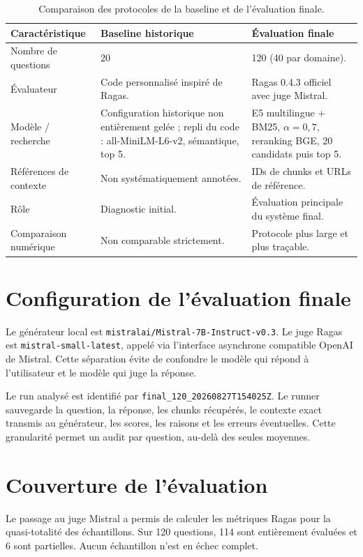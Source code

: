 \documentclass[12pt,a4paper,oneside]{report}
\begin{document}
\begin{table}[H]
\centering
\caption{Comparaison des protocoles de la baseline et de l'évaluation finale.}
\label{tab:protocoles}
\begin{tabularx}{\textwidth}{p{3.5cm}Y Y}
\toprule
\textbf{Caractéristique} & \textbf{Baseline historique} & \textbf{Évaluation finale}\\
\midrule
Nombre de questions & 20 & 120 (40 par domaine).\\
Évaluateur & Code personnalisé inspiré de Ragas. & Ragas 0.4.3 officiel avec juge Mistral.\\
Modèle / recherche & Configuration historique non entièrement gelée ; repli du code : all-MiniLM-L6-v2, sémantique, top 5. & E5 multilingue + BM25, $\alpha=0{,}7$, reranking BGE, 20 candidats puis top 5.\\
Références de contexte & Non systématiquement annotées. & IDs de chunks et URLs de référence.\\
Rôle & Diagnostic initial. & Évaluation principale du système final.\\
Comparaison numérique & Non comparable strictement. & Protocole plus large et plus traçable.\\
\bottomrule
\end{tabularx}
\end{table}

\section{Configuration de l'évaluation finale}

Le générateur local est \texttt{mistralai/Mistral-7B-Instruct-v0.3}. Le juge
Ragas est \texttt{mistral-small-latest}, appelé via l'interface asynchrone
compatible OpenAI de Mistral. Cette séparation évite de confondre le modèle qui
répond à l'utilisateur et le modèle qui juge la réponse.

Le run analysé est identifié par \texttt{final\_120\_20260827T154025Z}. Le
runner sauvegarde la question, la réponse, les chunks récupérés, le contexte
exact transmis au générateur, les scores, les raisons et les erreurs éventuelles.
Cette granularité permet un audit par question, au-delà des seules moyennes.

\section{Couverture de l'évaluation}

Le passage au juge Mistral a permis de calculer les métriques Ragas pour la
quasi-totalité des échantillons. Sur 120 questions, 114 sont entièrement
évaluées et 6 sont partielles. Aucun échantillon n'est en échec complet.
\end{document}
